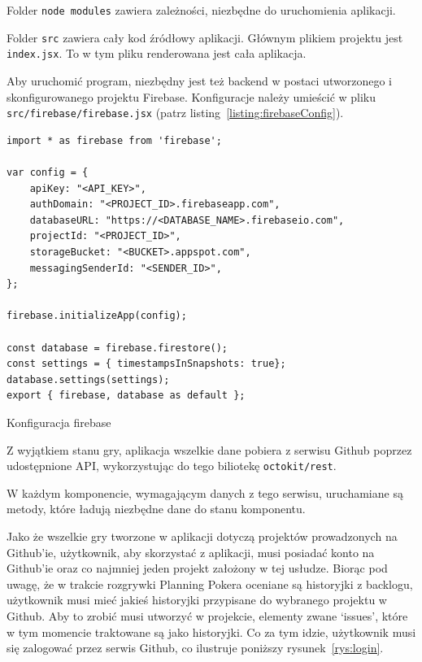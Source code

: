 Folder \texttt{node modules} zawiera zależności, niezbędne do uruchomienia aplikacji.

Folder \texttt{src} zawiera cały kod źródłowy aplikacji.
Głównym plikiem projektu jest \texttt{index.jsx}. To w tym pliku renderowana jest cała aplikacja.

Aby uruchomić program,
niezbędny jest też backend w postaci utworzonego i skonfigurowanego projektu Firebase.
Konfiguracje należy umieścić w pliku \texttt{src/firebase/firebase.jsx}
(patrz listing~\ref{listing:firebaseConfig}).

\begin{listing}
\begin{verbatim}
import * as firebase from 'firebase';

var config = {
    apiKey: "<API_KEY>",
    authDomain: "<PROJECT_ID>.firebaseapp.com",
    databaseURL: "https://<DATABASE_NAME>.firebaseio.com",
    projectId: "<PROJECT_ID>",
    storageBucket: "<BUCKET>.appspot.com",
    messagingSenderId: "<SENDER_ID>",
};

firebase.initializeApp(config);

const database = firebase.firestore();
const settings = { timestampsInSnapshots: true};
database.settings(settings);
export { firebase, database as default };
\end{verbatim}
\caption{Konfiguracja firebase}\label{listing:firebaseConfig}
\end{listing}

Z wyjątkiem stanu gry, aplikacja wszelkie dane pobiera z serwisu Github poprzez
udostępnione API, wykorzystując do tego biliotekę \texttt{octokit/rest}.

W każdym komponencie, wymagającym danych z tego serwisu,
uruchamiane są metody, które ładują niezbędne dane do stanu komponentu.

Jako że wszelkie gry tworzone w aplikacji dotyczą projektów prowadzonych na Github'ie,
użytkownik, aby skorzystać z aplikacji, musi posiadać konto na Github'ie oraz co najmniej
jeden projekt założony w tej usłudze.
Biorąc pod uwagę, że w trakcie rozgrywki Planning Pokera oceniane są historyjki z backlogu,
użytkownik musi mieć jakieś historyjki przypisane do wybranego projektu w Github.
Aby to zrobić musi utworzyć w projekcie, elementy zwane `issues', które w tym momencie traktowane są jako historyjki.
Co za tym idzie, użytkownik musi się zalogować przez serwis Github, co ilustruje poniższy rysunek~\ref{rys:login}.

